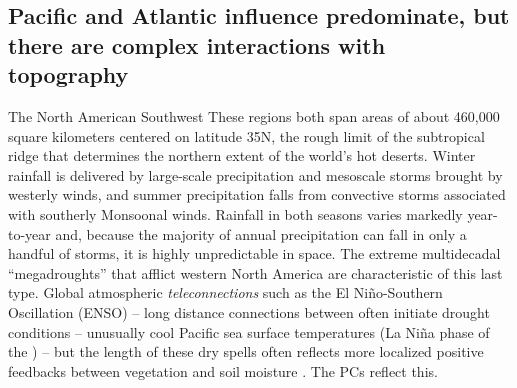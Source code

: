 \documentclass[fleqn,10pt]{wlscirep}
\begin{document}
\subsection*{Pacific and Atlantic influence predominate, but there are complex interactions with topography}
The North American Southwest These regions both span areas of about 460,000 square kilometers centered on latitude 35\degree N, the rough limit of the subtropical ridge that determines the northern extent of the world's hot deserts. Winter rainfall is delivered by large-scale precipitation and mesoscale storms brought by westerly winds, and summer precipitation falls from convective storms associated with southerly Monsoonal winds. Rainfall in both seasons varies markedly year-to-year and, because the majority of annual precipitation can fall in only a handful of storms, it is highly unpredictable in space. The extreme multidecadal ``megadroughts'' that afflict western North America are characteristic of this last type. Global atmospheric \textit{teleconnections} such as the El Ni\~{n}o-Southern Oscillation (ENSO) -- long distance connections between often initiate drought conditions -- unusually cool Pacific sea surface temperatures (La Ni\~{n}a phase of the ) -- but the length of these dry spells often reflects more localized positive feedbacks between vegetation and soil moisture \cite{Koster2004RegionsPrecipitation,Ault2014AssessingData}.
The PCs reflect this.
\end{document}
